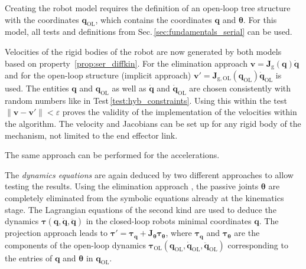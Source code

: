 \documentclass[runningheads]{llncs}
\begin{document}

\begin{property}\label{prop:hyb_velo}
Creating the robot model requires the definition of an open-loop tree structure with the coordinates $\bm{q}_\mathrm{OL}$, which contains the coordinates $\bm{q}$ and $\bm{\theta}$. For this model, all tests and definitions from Sec.\,\ref{sec:fundamentals_serial} can be used. 
\end{property}

\begin{test}\label{test:hyb_velo}
Velocities of the rigid bodies of the robot are now generated by both models based on property~\ref{prop:ser_diffkin}.
For the elimination approach
$\bm{v}{=}\bm{J}_{\mathrm{g}}(\bm{q})\dot{\bm{q}}$   and %
for the open-loop structure (implicit approach)
$\bm{v}'{=}\bm{J}_{\mathrm{g,OL}}(\bm{q}_{\mathrm{OL}})\dot{\bm{q}}_{\mathrm{OL}}$ is used.
The entities $\bm{q}$ and $\bm{q}_{\mathrm{OL}}$ as well as $\dot{\bm{q}}$ and $\dot{\bm{q}}_{\mathrm{OL}}$ are chosen consistently with random numbers like in Test\,\ref{test:hyb_constraints}.
Using this within the test $\lVert \bm{v}{-}\bm{v}' \rVert {<} \varepsilon$ proves the validity of the implementation of the velocities within the algorithm.
The velocity and Jacobians can be set up for any rigid body of the mechanism, not limited to the end effector link.
\end{test}
The same approach can be performed for the accelerations.


\begin{property}\label{prop:hyb_dyn}
The \emph{dynamics equations} are again deduced by two different approaches to allow testing the results.
Using the elimination approach \cite{SchapplerLilHad2019}, the passive joints $\bm{\theta}$ are completely eliminated from the symbolic equations already at the kinematics stage.
The Lagrangian equations of the second kind are used to deduce the dynamics $\bm{\tau}(\bm{q},\dot{\bm{q}},\ddot{\bm{q}})$ in the closed-loop robots minimal coordinates $\bm{q}$.
The projection approach leads to $\bm{\tau}'{=}\bm{\tau}_{\bm{q}}{+}\bm{J}_{\bm{\theta}}\bm{\tau}_{\bm{\theta}}$, where $\bm{\tau}_{\bm{q}}$ and $\bm{\tau}_{\bm{\theta}}$ are the components of the open-loop dynamics $\bm{\tau}_{\mathrm{OL}}(\bm{q}_{\mathrm{OL}},\dot{\bm{q}}_{\mathrm{OL}},\ddot{\bm{q}}_{\mathrm{OL}})$ corresponding to the entries of $\bm{q}$ and $\bm{\theta}$ in $\bm{q}_{\mathrm{OL}}$. 
\end{property}
\end{document}
